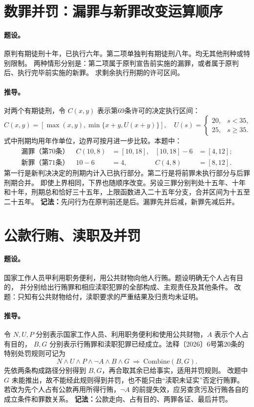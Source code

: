 \section{数罪并罚：漏罪与新罪改变运算顺序}

\paragraph{题设。}
原判有期徒刑十年，已执行六年。第二项单独判有期徒刑八年。均无其他刑种或特别限制。
两种情形分别是：第二项属于原判宣告前实施的漏罪，或者属于原判后、执行完毕前实施的新罪。
求剩余执行刑期的许可区间。

\paragraph{推导。}
对两个有期徒刑，令 $C(x,y)$ 表示第69条许可的决定执行区间：
\[
C(x,y)=
 \left[\max(x,y),\min\{x+y,U(x+y)\}\right],
\quad
 U(s)=\begin{cases}20,&s<35,\\25,&s\ge35.\end{cases}
\]
式中刑期均用年作单位，边界可按月进一步比较。本题中：
\begin{align*}
 \text{漏罪（第70条）}\quad
 C(10,8)&=[10,18],&
 [10,18]-6&=[4,12];\\
 \text{新罪（第71条）}\quad
 10-6&=4,&
 C(4,8)&=[8,12].
\end{align*}
第一行是新判决决定的刑期内计入已执行部分。第二行是将前罪未执行部分与后罪刑期合并。
即使上界相同，下界也随顺序改变。另设三罪分别判处十五年、十年和十年，刑期总和恰好三十五年，上限函数进入二十五年分支，合并区间为十五至二十五年。
\textbf{记法：}先问行为在原判前还是后。漏罪先并后减，新罪先减后并。

\section{公款行贿、渎职及并罚}

\paragraph{题设。}
国家工作人员甲利用职务便利，用公共财物向他人行贿。题设明确无个人占有目的，
并分别给出行贿罪和相应渎职犯罪的全部构成、主观责任及其他条件。
改题：只知有公共财物给付，渎职要求的严重结果及归责均未证明。

\paragraph{推导。}
令 $N,U,P$ 分别表示国家工作人员、利用职务便利和使用公共财物，$A$ 表示个人占有目的，
$B,G$ 分别表示行贿罪和渎职犯罪已经成立。法释〔2026〕6号第20条的特别处罚规则可记为
\[
 N\land U\land P\land\neg A\land B\land G
 \ \Rightarrow\ \mathrm{Combine}(B,G).
\]
先依两条构成路径分别得到 $B,G$，再合取其余已给事实，适用并罚规则。
改题中 $G$ 未能推出，故不能经此规则得到并罚，也不能只由“渎职未证实”否定行贿罪。
若改为先个人占有公款再用所得行贿，$\neg A$ 的前提失效，应另查贪污及行贿各自的成立条件和罪数关系。
\textbf{记法：}公款走向、占有目的、两罪各证、最后并罚。
